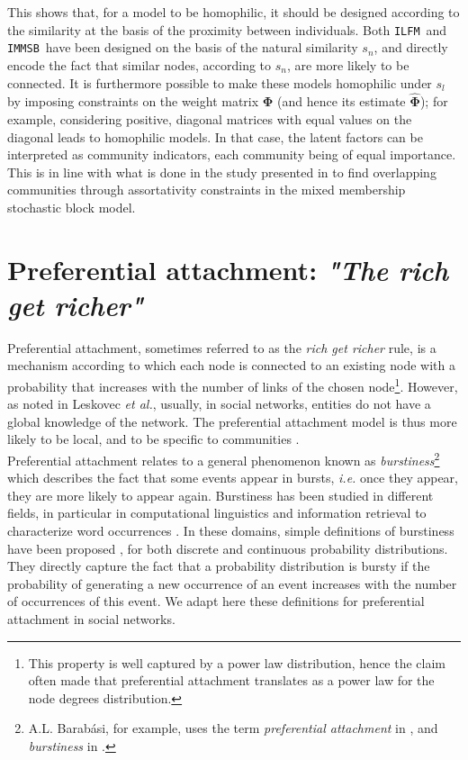 \documentclass[conference]{IEEEtran}
\newcommand{\ifm}{\texttt{ILFM}}
\newcommand{\imb}{\texttt{IMMSB}}
\newcommand{\mat}[1]{\mathbf{#1}}
\begin{document}
This shows that, for a model to be homophilic, it should be designed according to the similarity at the basis of the proximity between individuals. Both \ifm\ and \imb\ have been designed on the basis of the natural similarity $s_n$, and directly encode the fact that similar nodes, according to $s_n$, are more likely to be connected.  It is furthermore possible to make these models homophilic under $s_l$ by imposing constraints on the weight matrix $\mat{\Phi}$ (and hence its estimate $\mat{\hat{\Phi}}$); for example, considering positive, diagonal matrices with equal values on the diagonal leads to homophilic models. In that case, the latent factors can be interpreted as community indicators, each community being of equal importance. This is in line with what is done in the study presented in \cite{AMMSB} to find overlapping communities through assortativity constraints in the mixed membership stochastic block model.

\section{Preferential attachment: \emph{"The rich get richer"}}
\label{sec:burstiness}

Preferential attachment, sometimes referred to as the \textit{rich get richer} rule, is a mechanism according to which each node is connected to an existing node with a probability that increases with the number of links of the chosen node\footnote{This property is well captured by a power law distribution, hence the claim often made that preferential attachment translates as a power law for the node degrees distribution.}. However, as noted in Leskovec \textit{et al.}, usually, in social networks, entities do not have a global knowledge of the network. The preferential attachment model is thus more likely to be local, and to be specific to communities \cite{LeskovecBKT08}.~\\

Preferential attachment relates to a general phenomenon known as \textit{burstiness}\footnote{A.L. Barab\'asi, for example, uses the term \textit{preferential attachment} in \cite{barabasi1999emergence}, and \textit{burstiness} in \cite{barabasi_burst}.} which describes the fact that some events appear in bursts, \textit{i.e.} once they appear, they are more likely to appear again. Burstiness has been studied in different fields, in particular in computational linguistics and information retrieval to characterize word occurrences \cite{church1995poisson}. In these domains, simple definitions of burstiness have been proposed \cite{clinchant2008bnb,clinchant2010information}, for both discrete and continuous probability distributions. They directly capture the fact that a probability distribution is bursty if the probability of generating a new occurrence of an event increases with the number of occurrences of this event. We adapt here these definitions for preferential attachment in social networks.~\\
\end{document}
